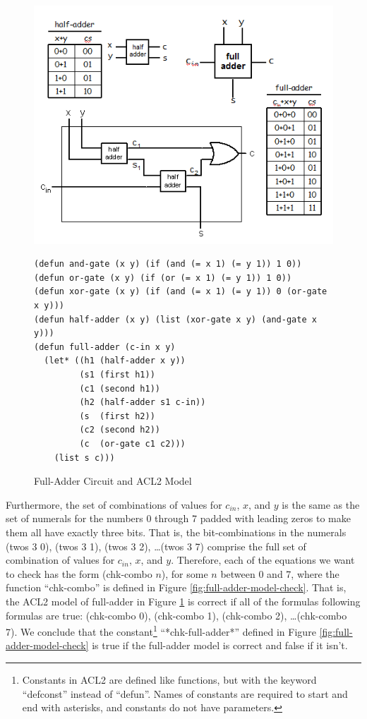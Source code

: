 \begin{figure}
\begin{center}
\includegraphics[scale=0.9]{Images/full-adder.png}
\begin{Verbatim}
(defun and-gate (x y) (if (and (= x 1) (= y 1)) 1 0))
(defun or-gate (x y) (if (or (= x 1) (= y 1)) 1 0))
(defun xor-gate (x y) (if (and (= x 1) (= y 1)) 0 (or-gate x y)))
(defun half-adder (x y) (list (xor-gate x y) (and-gate x y)))
(defun full-adder (c-in x y)
  (let* ((h1 (half-adder x y))
         (s1 (first h1))
         (c1 (second h1))
         (h2 (half-adder s1 c-in))
         (s  (first h2))
         (c2 (second h2))
         (c  (or-gate c1 c2)))
    (list s c)))
\end{Verbatim}
\end{center}
\caption{Full-Adder Circuit and ACL2 Model}
\label{fig:full-adder}
\end{figure}

Furthermore, the set of combinations of values for $c_{in}$, $x$, and $y$
is the same as the set of numerals for the numbers 0 through 7
padded with leading zeros to make them all have exactly three bits.
That is, the bit-combinations in the numerals
(twos 3 0), (twos 3 1), (twos 3 2), \dots (twos 3 7) comprise
the full set of combination of values for $c_{in}$, $x$, and $y$.
Therefore, each of the equations we want to check
has the form (chk-combo $n$), for some $n$ between 0 and 7,
where the function ``chk-combo'' is defined in
Figure \ref{fig:full-adder-model-check}.
That is, the ACL2 model of full-adder in Figure \ref{fig:full-adder}
is correct if all of the formulas following formulas are true:
(chk-combo 0), (chk-combo 1), (chk-combo 2), \dots (chk-combo 7).
We conclude that the constant\footnote{Constants in ACL2
are defined like functions, but with the keyword ``defconst'' instead
of ``defun''. Names of constants are required to start and end with asterisks,
and constants do not have parameters.}
``*chk-full-adder*'' defined in
Figure \ref{fig:full-adder-model-check} is true if the full-adder model
is correct and false if it isn't.

